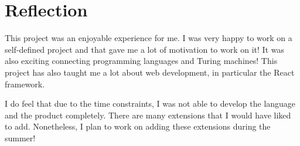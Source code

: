 \section{Reflection}
This project was an enjoyable experience for me. I was very happy to work on a self-defined project and that gave me a lot of motivation to work on it! It was also exciting connecting programming languages and Turing machines! This project has also taught me a lot about web development, in particular the React framework.

I do feel that due to the time constraints, I was not able to develop the language and the product completely. There are many extensions that I would have liked to add. Nonetheless, I plan to work on adding these extensions during the summer!
